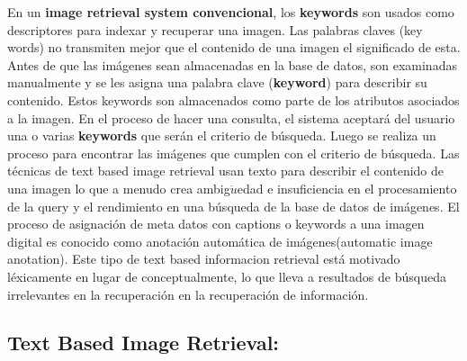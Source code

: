 \documentclass{llncs}
\begin{document}
En un \textbf{image retrieval system convencional}, los \textbf{keywords} son 
usados como descriptores para indexar y recuperar una imagen.  Las palabras 
claves (key words) no transmiten mejor que el contenido de una imagen 
el significado de esta. Antes de que las imágenes sean almacenadas en la base de datos, son examinadas 
manualmente y se les asigna una palabra  clave (\textbf{keyword}) para describir su 
contenido. Estos  keywords  son almacenados como parte de los atributos 
asociados a la imagen. En el proceso de hacer una consulta, el sistema 
aceptará del usuario una o varias \textbf{keywords} que serán el criterio de búsqueda.
Luego se realiza un proceso para encontrar las imágenes que cumplen con el criterio 
de búsqueda. Las t\'ecnicas de text based image retrieval usan texto para describir el 
contenido de una imagen lo que a menudo crea ambig$\ddot{u}$edad e insuficiencia en el 
procesamiento de la query y el rendimiento en una b\'usqueda de la base de datos de 
im\'agenes. El proceso de asignaci\'on de meta datos con captions o keywords a una imagen
digital es conocido como anotaci\'on autom\'atica de im\'agenes(automatic image anotation).
Este tipo de text based informacion retrieval est\'a motivado l\'exicamente en lugar de 
conceptualmente, lo que lleva a resultados de b\'usqueda irrelevantes en la recuperaci\'on en la 
recuperaci\'on de informaci\'on.
\\

\subsection{Text Based Image Retrieval:}
\end{document}
